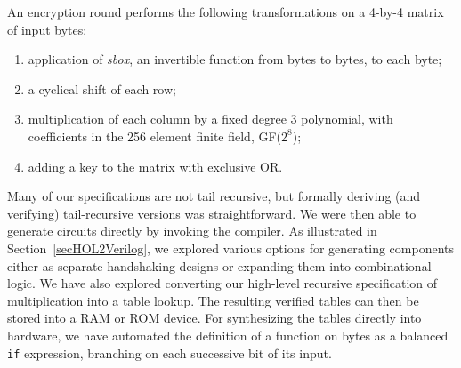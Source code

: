 \documentclass{llncs}
\begin{document}
An encryption round performs the following transformations on a 4-by-4 matrix
of input bytes:
\begin{enumerate}
\item
application of \emph{sbox}, an invertible function from bytes to bytes,
to each byte;
\item
a cyclical shift of each row;
\item
multiplication of each column by a fixed degree 3 polynomial, with coefficients
in the 256 element finite field, GF($2^8$);
\item
adding a key to the matrix with exclusive OR.
\end{enumerate}


Many of our specifications are not tail recursive, but formally
deriving (and verifying) tail-recursive versions was
straightforward. We were then able to generate circuits directly by invoking
the compiler.  As illustrated in
Section~\ref{secHOL2Verilog}, we explored various options for
generating components either as separate handshaking designs or expanding
them into combinational logic. We have also explored converting our
high-level recursive specification of multiplication into a table
lookup. The resulting verified tables can then be stored into a RAM or
ROM device.  For synthesizing the tables directly into hardware, we
have automated the definition of a function on bytes as a balanced
\texttt{if} expression, branching on each successive bit of its input.
\end{document}
